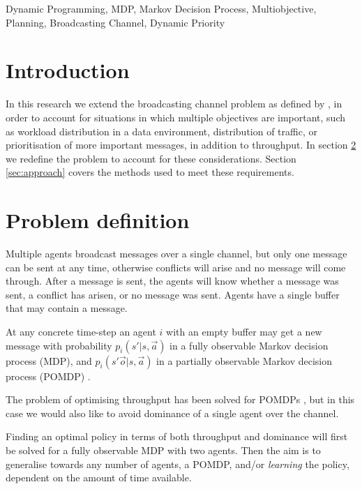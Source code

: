 \documentclass{article}
\date{}
\begin{document}
	\maketitle
	\begin{keywords}
		Dynamic Programming, MDP, Markov Decision Process, Multiobjective,
		Planning, Broadcasting Channel, Dynamic Priority
	\end{keywords}


	\begin{multicols}{2}

	\section{Introduction}
	\label{sec:introduction}
	In this research we extend the broadcasting channel problem as defined by
	\citet{ooi1996decentralized}, in order to account for situations in which
	multiple objectives are important, such as workload distribution in a data
	environment, distribution of traffic, or prioritisation of more important
	messages, in addition to throughput.
	In section \ref{sec:problem_definition} we redefine the problem to account
	for these considerations. Section \ref{sec:approach} covers the methods used
	to meet these requirements.

	\section{Problem definition}
	\label{sec:problem_definition}
	Multiple agents broadcast messages over a single channel, but only one
	message can be sent at any time, otherwise conflicts will arise and no
	message will come through. After a message is sent, the agents will know
	whether a message was sent, a conflict has arisen, or no message was sent.
	Agents have a single buffer that may contain a message.

	At any concrete time-step an agent $i$ with an empty buffer may get a new
	message with probability $p_i(s' |s, \vec{a})$ in a fully observable Markov
	decision process (MDP), and $p_i(s' \vec{o}|s, \vec{a})$ in a partially
	observable Markov decision process (POMDP) \citep{hansen2004dynamic}.

	The problem of optimising throughput has been solved for POMDPs
	\citep{ooi1996decentralized, hansen2004dynamic}, but in this case we would
	also like to avoid dominance of a single agent over the channel.

	Finding an optimal policy in terms of both throughput and dominance will
	first be solved for a fully observable MDP with two agents. Then the aim is
	to generalise towards any number of agents, a POMDP, and/or \emph{learning}
	the policy, dependent on the amount of time available.


\end{multicols}
\end{document}
